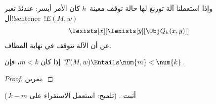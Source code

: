 \documentclass[../../../include/open-logic-section]{subfiles}
\begin{document}
وإذا استعملنا آلة تورنغ لها حالة توقف معينة~$h$ كان الأمر أيسر: عندئذ
تعبر ال!!{sentence}~$!E(M,w)$
\[
\lexists[x][\lexists[y][\Obj Q_h(x, y)]]
\]
عن أن الآلة تتوقف في نهاية المطاف.

\begin{prop}
إذا كان $m<k$، فإن $!T(M,w)\Entails\num{m}<\num{k}$.
\end{prop}

\begin{proof}
تمرين.
\end{proof}

\begin{prob}
أثبت .
(تلميح: استعمل الاستقراء على $k-m$.)
\end{prob}
\end{document}
